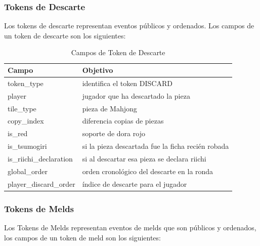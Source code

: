 \subsubsection{Tokens de Descarte}

Los tokens de descarte representan eventos públicos y ordenados. Los campos de un token de descarte son los siguientes:

\begin{table}[H]
  \centering
  \begin{tabular}{|l|l|}
  \hline
  \textbf{Campo} & \textbf{Objetivo}         \\ \hline
  token\_type    & identifica el token DISCARD    \\ \hline
  player & jugador que ha descartado la pieza \\ \hline
  tile\_type     & pieza de Mahjong    \\ \hline
  copy\_index    & diferencia copias de piezas \\ \hline
  is\_red        & soporte de dora rojo        \\ \hline
  is\_tsumogiri & si la pieza descartada fue la ficha recién robada \\ \hline
  is\_riichi\_declaration & si al descartar esa pieza se declara riichi \\ \hline
  global\_order & orden cronológico del descarte en la ronda \\ \hline
  player\_discard\_order & índice de descarte para el jugador \\ \hline
  \end{tabular}
  \caption{Campos de Token de Descarte}
  \label{tab:discard_token}
\end{table}


\subsubsection{Tokens de Melds}

Los Tokens de Melds representan eventos de melds que son públicos y ordenados, los campos de un token de meld son los siguientes:

